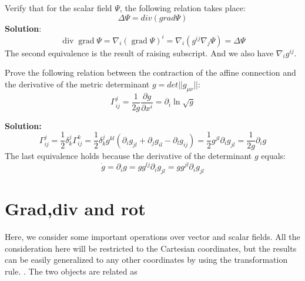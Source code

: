 \begin{example}
Verify that for the scalar field $\Psi$, the following relation takes place:
$$
\Delta \Psi=div(grad\Psi)
$$
\textbf{Solution}:
$$
\operatorname{div} \operatorname{grad} \Psi=\nabla_{i}(\operatorname{grad} \Psi)^{i}=\nabla_{i}\left(g^{i j} \nabla_{j} \Psi\right)=\Delta \Psi
$$
The second equivalence is the result of raising subscript. And we also have $\nabla_{i}g^{i j}$.
\end{example}
\begin{example}
Prove the following relation between the contraction of the affine connection and the derivative of the metric determinant $g=det||g_{\mu\nu}||$:
\begin{equation}
\Gamma_{i j}^{j}=\frac{1}{2 g} \frac{\partial g}{\partial x^{i}}=\partial_{i} \ln \sqrt{g}
\end{equation}
\end{example}
\textbf{Solution:}
$$
\Gamma_{i j}^{j}=\frac{1}{2} \delta_{k}^{j} \Gamma_{i j}^{k}=\frac{1}{2} \delta_{k}^{j}g^{kl}\left(\partial_{i} g_{j l}+\partial_{j} g_{i l}-\partial_{l} g_{i j}\right)=\frac{1}{2} g^{j l} \partial_{i} g_{j l}=\frac{1}{2 g} \partial_{i} g
$$
The last equivalence holds because the derivative of the determinant $g$ equals:
$$
\dot{g}=\partial_i g=g g^{lj} \partial_i g_{jl}=g g^{jl} \partial_i g_{jl}
$$

\section{Grad,div and rot}
Here, we consider some important operations over vector and scalar fields. All the consideration here will be restricted to the Cartesian coordinates, but the results can be easily generalized to any other coordinates by using the transformation rule. . The two objects are related as 

